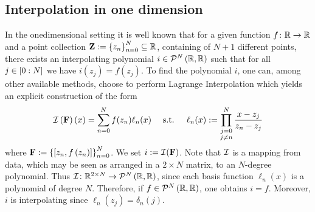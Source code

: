 \documentclass[12pt, oneside]{amsart}
\theoremstyle{definition}
\theoremstyle{remark}
\numberwithin{equation}{section}
\begin{document}
\subsection*{Interpolation in one dimension}
In the onedimensional setting it is well known that for a given function 
$f\from\R\to\R$ and a point collection \(\ZZ 
\defn \set{z_n}_{n=0}^N \subseteq \R\), containing of $N+1$ different points, 
there exists an interpolating polynomial $i\in\pols[N]{\R,\R}$ such that for 
all $j\in\indexset[0]{N}$ we have $i(z_j) = f(z_j)$.
To find the polynomial \(i\), one can, among other available methods, choose to 
perform Lagrange Interpolation which yields an explicit construction of the form
\begin{equation}\label{eq:lagrangeInterpolation}
    \mathcal{I}\left(\FF\right)(x) = \sum_{n=0}^N f(z_n) \ell_n(x)\quad \text{ 
    s.t. }\quad \ell_n(x) \defn \prod_{\substack{j = 0\\j \neq n}}^N 
    \frac{x-z_j}{z_n-z_j}
\end{equation}
where \(\FF \defn \set{\left[z_n, f\left(z_n\right)\right]}_{n=0}^{N}\). We set 
\(i \defn \cI(\FF)\). Note that \(\cI\) is a mapping from data, which may be 
seen as arranged in a \(2 \times N\) matrix, to an \(N\)-degree polynomial. 
Thus \(\cI\from \R^{2 \times N} \to \pols[N]{\R,\R}\), since each basis 
function \(\ell_n(x)\) is a polynomial of degree \(N\). Therefore, if \(f \in 
\pols[N]{\R, \R}\), one obtains \(i = f\). Moreover, \(i\) is interpolating 
since \(\ell_n(z_j) = \delta_{n}(j)\). \newline
\end{document}
